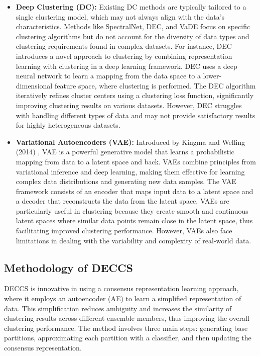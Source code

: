 \begin{itemize}
\item \textbf{Deep Clustering (DC):} Existing DC methods are typically tailored to a single clustering model, which may not always align with the data's characteristics. Methods like SpectralNet, DEC, and VaDE focus on specific clustering algorithms but do not account for the diversity of data types and clustering requirements found in complex datasets. For instance, DEC \citep{Xie2016} introduces a novel approach to clustering by combining representation learning with clustering in a deep learning framework. DEC uses a deep neural network to learn a mapping from the data space to a lower-dimensional feature space, where clustering is performed. The DEC algorithm iteratively refines cluster centers using a clustering loss function, significantly improving clustering results on various datasets. However, DEC struggles with handling different types of data and may not provide satisfactory results for highly heterogeneous datasets.

\item \textbf{Variational Autoencoders (VAE):} Introduced by Kingma and Welling (2014) \citep{Kingma2014}, VAE is a powerful generative model that learns a probabilistic mapping from data to a latent space and back. VAEs combine principles from variational inference and deep learning, making them effective for learning complex data distributions and generating new data samples. The VAE framework consists of an encoder that maps input data to a latent space and a decoder that reconstructs the data from the latent space. VAEs are particularly useful in clustering because they create smooth and continuous latent spaces where similar data points remain close in the latent space, thus facilitating improved clustering performance. However, VAEs also face limitations in dealing with the variability and complexity of real-world data.
\end{itemize}

\subsection{Methodology of DECCS}

DECCS is innovative in using a consensus representation learning approach, where it employs an autoencoder (AE) to learn a simplified representation of data. This simplification reduces ambiguity and increases the similarity of clustering results across different ensemble members, thus improving the overall clustering performance. The method involves three main steps: generating base partitions, approximating each partition with a classifier, and then updating the consensus representation.

